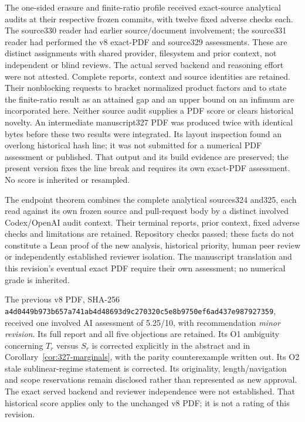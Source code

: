 \documentclass[11pt]{article}
\begin{document}
The one-sided erasure and finite-ratio profile received exact-source
analytical audits at their respective frozen commits, with twelve fixed
adverse checks each. The source330 reader had earlier source/document
involvement; the source331 reader had performed the v8 exact-PDF and
source329 assessments. These are distinct assignments with shared provider,
filesystem and prior context, not independent or blind reviews. The actual
served backend and reasoning effort were not attested. Complete reports,
context and source identities are retained. Their nonblocking requests to
bracket normalized product factors and to state the finite-ratio result as
an attained gap and an upper bound on an infimum are incorporated here.
Neither source audit supplies a PDF score or clears historical novelty.
An intermediate manuscript327 PDF was produced twice with identical bytes
before these two results were integrated. Its layout inspection found an
overlong historical hash line; it was not submitted for a numerical PDF
assessment or published. That output and its build evidence are preserved;
the present version fixes the line break and requires its own exact-PDF
assessment. No score is inherited or resampled.

The endpoint theorem combines the complete analytical sources324 and325,
each read against its own frozen source and pull-request body by a distinct
involved Codex/OpenAI audit context. Their terminal reports, prior context,
fixed adverse checks and limitations are retained. Repository checks passed;
these facts do not constitute a Lean proof of the new analysis, historical
priority, human peer review or independently established reviewer isolation.
The manuscript translation and this revision's eventual exact PDF require
their own assessment; no numerical grade is inherited.

The previous v8 PDF, SHA-256
\texttt{a4d0449b973b657a741ab4d48693d9c2}\allowbreak\texttt{70320c5e8b9750ef6ad437e987927359},
received one involved AI assessment of 5.25/10, with recommendation
\emph{minor revision}. Its full report and all five objections are retained.
Its O1 ambiguity concerning $T_r$ versus $S_r$ is corrected explicitly in
the abstract and in Corollary~\ref{cor:327-marginals}, with the parity
counterexample written out. Its O2 stale sublinear-regime statement is
corrected. Its originality, length/navigation and scope reservations remain
disclosed rather than represented as new approval. The exact served backend
and reviewer independence were not established. That historical score applies
only to the unchanged v8 PDF; it is not a rating of this revision.
\end{document}
